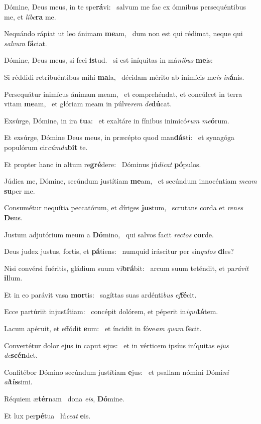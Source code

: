 \item Dómine, Deus meus, in te spe\textbf{rá}vi:~\psstar{} salvum me fac ex ómnibus persequéntibus me, et \textit{líbe}\textbf{ra} me.
\item Nequándo rápiat ut leo ánimam \textbf{me}am,~\psstar{} dum non est qui rédimat, neque qui \textit{salvum} \textbf{fá}ciat.
\item Dómine, Deus meus, si feci \textbf{is}tud.~\psstar{} si est iníquitas in má\textit{nibus} \textbf{me}is:
\item Si réddidi retribuéntibus mihi \textbf{ma}la,~\psstar{} décidam mérito ab inimícis me\textit{is} \textit{in}\textbf{á}nis.
\item Persequátur inimícus ánimam meam,~\pscross{} et comprehéndat, et concúlcet in terra vitam \textbf{me}am,~\psstar{} et glóriam meam in púlve\textit{rem} \textit{de}\textbf{dú}cat.
\item Exsúrge, Dómine, in ira \textbf{tu}a:~\psstar{} et exaltáre in fínibus inimicó\textit{rum} \textit{me}\textbf{ó}rum.
\item Et exsúrge, Dómine Deus meus, in præcépto quod man\textbf{dás}ti:~\psstar{} et synagóga populórum cir\textit{cúmda}\textbf{bit} te.
\item Et propter hanc in altum re\textbf{gré}dere:~\psstar{} Dóminus jú\textit{dicat} \textbf{pó}pulos.
\item Júdica me, Dómine, secúndum justítiam \textbf{me}am,~\psstar{} et secúndum innocéntiam \textit{meam} \textbf{su}per me.
\item Consumétur nequítia peccatórum, et díriges \textbf{jus}tum,~\psstar{} scrutans corda et \textit{renes} \textbf{De}us.
\item Justum adjutórium meum a \textbf{Dó}mino,~\psstar{} qui salvos facit \textit{rectos} \textbf{cor}de.
\item Deus judex justus, fortis, et \textbf{pá}tiens:~\psstar{} numquid iráscitur per sín\textit{gulos} \textbf{di}es?
\item Nisi convérsi fuéritis, gládium suum vi\textbf{brá}bit:~\psstar{} arcum suum teténdit, et pa\textit{rávit} \textbf{il}lum.
\item Et in eo parávit vasa \textbf{mor}tis:~\psstar{} sagíttas suas ardénti\textit{bus} \textit{ef}\hspace{-0.5mm}\textbf{fé}cit.
\item Ecce partúriit injus\textbf{tí}tiam:~\psstar{} concépit dolórem, et péperit in\textit{iqui}\textbf{tá}tem.
\item Lacum apéruit, et effódit \textbf{e}um:~\psstar{} et íncidit in fóve\textit{am} \textit{quam} \textbf{fe}cit.
\item Convertétur dolor ejus in caput \textbf{e}jus:~\psstar{} et in vérticem ipsíus iníquitas e\textit{jus} \textit{de}\textbf{scén}det.
\item Confitébor Dómino secúndum justítiam \textbf{e}jus:~\psstar{} et psallam nómini Dómi\textit{ni} \textit{al}\textbf{tís}simi.
\item Réquiem æ\textbf{tér}nam~\psstar{} dona \textit{eis}, \textbf{Dó}mine.
\item Et lux per\textbf{pé}tua~\psstar{} lú\textit{ceat} \textbf{e}is.